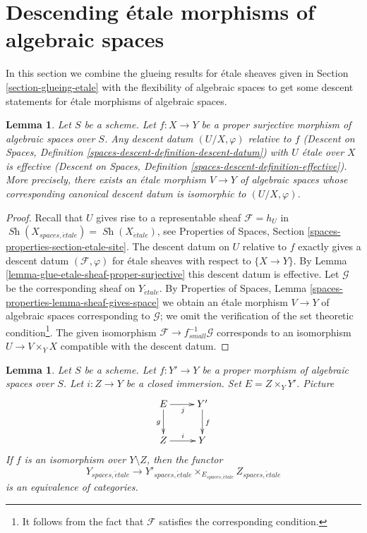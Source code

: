 \documentclass{stacks-project}
\theoremstyle{plain}
\newtheorem{lemma}[subsection]{Lemma}
\theoremstyle{definition}
\theoremstyle{remark}
\numberwithin{equation}{subsection}
\def\Sh{\mathop{\mathit{Sh}}\nolimits}
\def\etale{{\acute{e}tale}}
\begin{document}
\section{Descending \'etale morphisms of algebraic spaces}
\label{section-descending-etale}

\noindent
In this section we combine the glueing results for \'etale sheaves given in
Section \ref{section-glueing-etale} with the flexibility of algebraic spaces
to get some descent statements for \'etale morphisms of algebraic spaces.

\begin{lemma}
\label{lemma-descend-etale-proper-surjective}
Let $S$ be a scheme. Let $f : X \to Y$ be a proper surjective morphism
of algebraic spaces over $S$. Any descent datum $(U/X, \varphi)$ relative to $f$
(Descent on Spaces, Definition \ref{spaces-descent-definition-descent-datum})
with $U$ \'etale over $X$ is effective
(Descent on Spaces, Definition \ref{spaces-descent-definition-effective}).
More precisely, there exists an \'etale morphism $V \to Y$ of algebraic spaces
whose corresponding canonical descent datum is isomorphic to $(U/X, \varphi)$.
\end{lemma}

\begin{proof}
Recall that $U$ gives rise to a representable sheaf
$\mathcal{F} = h_U$ in $\Sh(X_{spaces, \etale}) = \Sh(X_\etale)$, see
Properties of Spaces, Section \ref{spaces-properties-section-etale-site}.
The descent datum on $U$ relative to $f$
exactly gives a descent datum $(\mathcal{F}, \varphi)$
for \'etale sheaves with respect to $\{X \to Y\}$.
By Lemma \ref{lemma-glue-etale-sheaf-proper-surjective}
this descent datum is effective.
Let $\mathcal{G}$ be the corresponding sheaf on $Y_\etale$.
By Properties of Spaces, Lemma \ref{spaces-properties-lemma-sheaf-gives-space}
we obtain an \'etale morphism $V \to Y$ of algebraic spaces
corresponding to $\mathcal{G}$; we omit the verification of
the set theoretic condition\footnote{It follows from the
fact that $\mathcal{F}$ satisfies the corresponding condition.}.
The given isomorphism $\mathcal{F} \to f_{small}^{-1}\mathcal{G}$
corresponds to an isomorphism $U \to V \times_Y X$ compatible
with the descent datum.
\end{proof}

\begin{lemma}
\label{lemma-glue-etale-space-modification}
Let $S$ be a scheme. Let $f : Y' \to Y$ be a proper morphism of
algebraic spaces over $S$. Let $i : Z \to Y$
be a closed immersion. Set $E = Z \times_Y Y'$. Picture
$$
\xymatrix{
E \ar[d]_g \ar[r]_j & Y' \ar[d]^f \\
Z \ar[r]^i & Y
}
$$
If $f$ is an isomorphism over $Y \setminus Z$, then the functor
$$
Y_{spaces, \etale}
\longrightarrow
Y'_{spaces, \etale} \times_{E_{spaces, \etale}} Z_{spaces, \etale}
$$
is an equivalence of categories.
\end{lemma}
\end{document}
